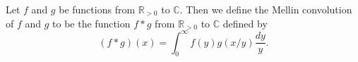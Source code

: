 \begin{definition}[MellinConvolution]
\label{MellinConvolution}
\leanok
Let $f$ and $g$ be functions from $\mathbb{R}_{>0}$ to $\mathbb{C}$. Then we define the
  Mellin convolution of $f$ and $g$ to be the function $f\ast g$ from $\mathbb{R}_{>0}$
  to $\mathbb{C}$ defined by
  $$(f\ast g)(x) = \int_0^\infty f(y)g(x/y)\frac{dy}{y}.$$
\end{definition}
